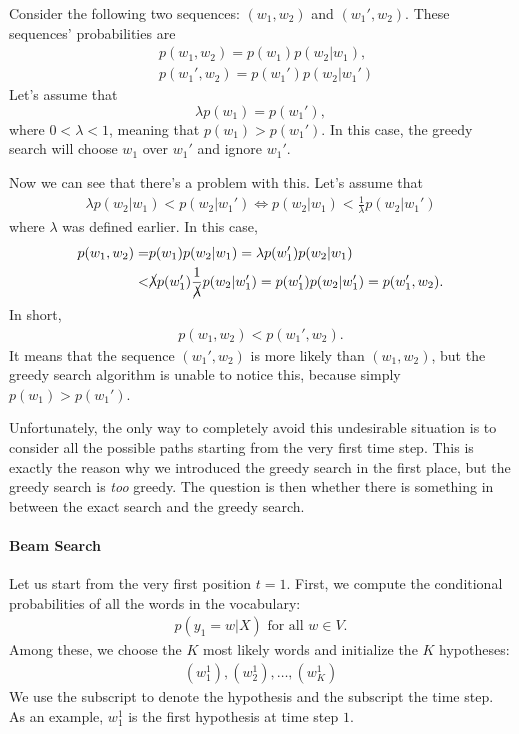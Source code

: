 \documentclass{report}
\begin{document}
Consider the following two sequences: $\left(w_1, w_2\right)$ and $\left(w_1',
w_2\right)$. These sequences' probabilities are 
\begin{align*}
    &p(w_1, w_2) = p(w_1) p(w_2 | w_1), \\
    &p(w_1', w_2)= p(w_1') p(w_2 | w_1')
\end{align*}
Let's assume that 
\[
    \lambda p(w_1) = p(w_1'),
\]
where $0 < \lambda < 1$, meaning that $p(w_1) > p(w_1')$. In this case, the
greedy search will choose $w_1$ over $w_1'$ and ignore $w_1'$.

Now we can see that there's a problem with this. Let's assume that
\begin{align*}
    \lambda p(w_2 | w_1) < p(w_2 | w_1') \iff p(w_2 | w_1) < \frac{1}{\lambda}
    p(w_2 | w_1')
\end{align*}
where $\lambda$ was defined earlier. In this case,
\begin{align*}
    p(w_1, w_2) =& p(w_1) p(w_2 | w_1) 
    = \lambda p(w_1') p(w_2 | w_1) \\ <&
    \cancel{\lambda} p(w_1') \frac{1}{\cancel{\lambda}} p(w_2 | w_1') 
    = p(w_1') p(w_2 | w_1') = p(w_1', w_2).
\end{align*}
In short,
\begin{align*}
    p(w_1, w_2) < p(w_1', w_2).
\end{align*}
It means that the sequence $(w_1',w_2)$ is more likely than $(w_1, w_2)$, but
the greedy search algorithm is unable to notice this, because simply $p(w_1) >
p(w_1')$.  

Unfortunately, the only way to completely avoid this undesirable situation is to
consider all the possible paths starting from the very first time step. This is
exactly the reason why we introduced the greedy search in the first place, but
the greedy search is {\em too} greedy. The question is then whether there is
something in between the exact search and the greedy search.

\paragraph{Beam Search}

Let us start from the very first position $t=1$. First, we compute the
conditional probabilities of all the words in the vocabulary:
\begin{align*}
    p(y_1=w|X)\text{ for all }w\in V.
\end{align*}
Among these, we choose the $K$ most likely words and initialize the $K$
hypotheses:
\begin{align*}
    (w_1^1),(w_2^1), \ldots, (w_K^1)
\end{align*}
We use the subscript to denote the hypothesis and the subscript the time step.
As an example, $w_1^1$ is the first hypothesis at time step $1$.
\end{document}
